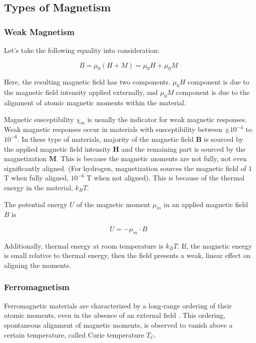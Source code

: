 \subsection{Types of Magnetism}

\subsubsection{Weak Magnetism}

Let's take the following equality into consideration:

\begin{equation}
	B = \mu_{0} (H+M) = \mu_{0}H + \mu_{0}M
\end{equation}

Here, the resulting magnetic field has two components. $\mu_{0}H$ component is due to the magnetic field intensity applied externally, and $\mu_{0}M$ component is due to the alignment of atomic magnetic moments within the material.

Magnetic susceptibility $\chi_{m}$ is usually the indicator for weak magnetic responses. Weak magnetic responses occur in materials with susceptibility between $\pm 10^{-4}$ to $10^{-6}$. In these type of materials, majority of the magnetic field $\textbf{B}$ is sourced by the applied magnetic field intensity $\textbf{H}$ and the remaining part is sourced by the magnetization 	$\textbf{M}$. This is because the magnetic moments are not fully, not even significantly aligned. (For hydrogen, magnetization sources the magnetic field of $1$ T when fully aligned, $10^{-6}$ T when not aligned). This is because of the thermal energy in the material, $k_{B}T$.

The potential energy $U$ of the magnetic moment $\mu_{m}$ in an applied magnetic field $B$ is

\begin{equation}
	U = -\mu_{m} \cdot B
\end{equation}

Additionally, thermal energy at room temperature is $k_{B}T$. If, the magnetic energy is small relative to thermal energy, then the field presents a weak, linear effect on aligning the moments.


\subsubsection{Ferromagnetism}

Ferromagnetic materials are characterized by a long-range ordering of their atomic moments, even in the absence of an external field \cite{O'Handley}. This ordering, spontaneous alignment of magnetic moments, is observed to vanish above a certain temperature, called Curie temperature $T_{C}$.


